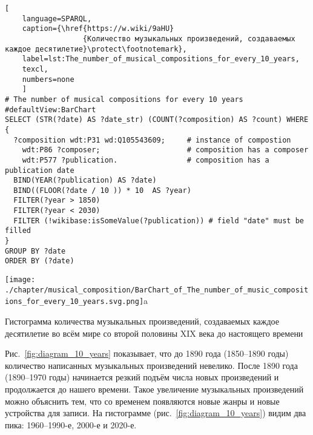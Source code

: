 \begin{lstlisting}[ 
    language=SPARQL,
    caption={\href{https://w.wiki/9aHU}
                  {Количество музыкальных произведений, создаваемых каждое десятилетие}\protect\footnotemark},
    label=lst:The_number_of_musical_compositions_for_every_10_years,
    texcl,
    numbers=none
    ]
# The number of musical compositions for every 10 years
#defaultView:BarChart
SELECT (STR(?date) AS ?date_str) (COUNT(?composition) AS ?count) WHERE {
  ?composition wdt:P31 wd:Q105543609;     # instance of compostion
    wdt:P86 ?composer;                    # composition has a composer
    wdt:P577 ?publication.                # composition has a publication date
  BIND(YEAR(?publication) AS ?date)
  BIND((FLOOR(?date / 10 )) * 10  AS ?year)
  FILTER(?year > 1850)
  FILTER(?year < 2030) 
  FILTER (!wikibase:isSomeValue(?publication)) # field "date" must be filled
}
GROUP BY ?date
ORDER BY (?date)
\end{lstlisting}%


\newpage
\begin{marginfigure}[-5\baselineskip]
    \texttt{[image: ./chapter/musical\_composition/BarChart\_of\_The\_number\_of\_music\_compositions\_for\_every\_10\_years.svg.png]}a
    \vspace{-7pt}
	\caption{Гистограмма количества музыкальных произведений, 
             создаваемых каждое десятилетие во всём мире со второй половины XIX века до настоящего времени}%
	\label{fig:diagram_10_years}%
\end{marginfigure}
%
Рис.~\ref{fig:diagram_10_years} показывает, что до 1890 года (1850--1890 годы) 
количество написанных музыкальных произведений невелико. 
После 1890 года (1890--1970 годы) начинается резкий подъём числа новых произведений 
и продолжается до нашего времени. 
Такое увеличение музыкальных произведений можно объяснить тем, 
что со временем появляются новые жанры и новые устройства для записи. 
На гистограмме (рис.~\ref{fig:diagram_10_years}) видим два пика: 1960--1990-е, 2000-е и 2020-е.



